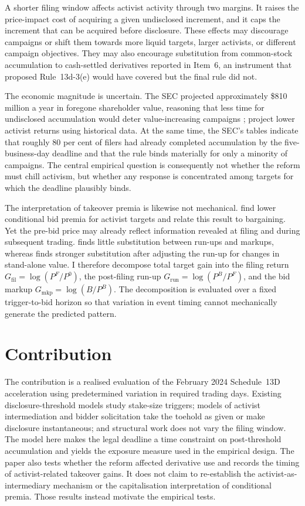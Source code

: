 A shorter filing window affects activist activity through two margins. It
raises the price-impact cost of acquiring a given undisclosed increment, and it
caps the increment that can be acquired before disclosure. These effects may
discourage campaigns or shift them towards more liquid targets, larger
activists, or different campaign objectives. They may also encourage
substitution from common-stock accumulation to cash-settled derivatives reported
in Item~6, an instrument that proposed Rule~13d-3(e) would have covered but the
final rule did not.

The economic magnitude is uncertain. The SEC projected approximately
\$810 million a year in foregone shareholder value, reasoning that less time for
undisclosed accumulation would deter value-increasing campaigns
\parencite{sec2023modernization}; \textcite{polk2024} project lower activist
returns using historical data. At the same time, the SEC's tables indicate that
roughly 80 per cent of filers had already completed accumulation by the
five-business-day deadline and that the rule binds materially for only a
minority of campaigns. The central empirical question is consequently not
whether the reform must chill activism, but whether any response is concentrated
among targets for which the deadline plausibly binds.

The interpretation of takeover premia is likewise not mechanical.
\textcite{celentanolevine2025} find lower conditional bid premia for activist
targets and relate this result to bargaining. Yet the pre-bid price may already
reflect information revealed at filing and during subsequent trading.
\textcite{schwert1996} finds little substitution between run-ups and markups,
whereas \textcite{bett2014} finds stronger substitution after adjusting the
run-up for changes in stand-alone value. I therefore decompose total target gain
into the filing return $G_{\mathrm{fil}}=\log(P^F/P^0)$, the post-filing run-up
$G_{\mathrm{run}}=\log(P^B/P^F)$, and the bid markup
$G_{\mathrm{mkp}}=\log(B/P^B)$. The decomposition is evaluated over a fixed
trigger-to-bid horizon so that variation in event timing cannot mechanically
generate the predicted pattern.

\section{Contribution}
\label{sec:contribution}

The contribution is a realised evaluation of the February 2024 Schedule~13D
acceleration using predetermined variation in required trading days. Existing
disclosure-threshold models study stake-size triggers; models of activist
intermediation and bidder solicitation take the toehold as given or make
disclosure instantaneous; and structural work does not vary the filing window.
The model here makes the legal deadline a time constraint on post-threshold
accumulation and yields the exposure measure used in the empirical design. The
paper also tests whether the reform affected derivative use and records the
timing of activist-related takeover gains. It does not claim to re-establish the
activist-as-intermediary mechanism or the capitalisation interpretation of
conditional premia. Those results instead motivate the empirical tests.
